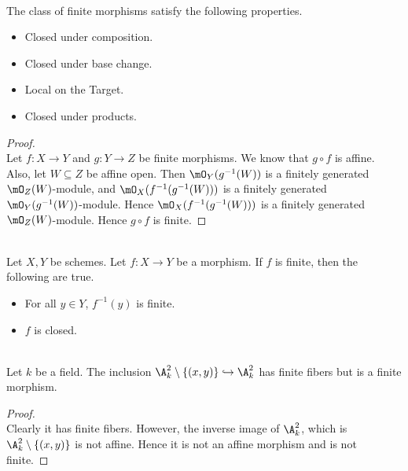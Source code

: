 \documentclass[a4paper]{article}
\begin{document}
\begin{lmm}{}{}\\
The class of finite morphisms satisfy the following properties. 
\begin{itemize}
\item Closed under composition. 
\item Closed under base change. 
\item Local on the Target. 
\item Closed under products. 
\end{itemize}
\begin{proof}\\
Let $f:X\to Y$ and $g:Y\to Z$ be finite morphisms. We know that $g\circ f$ is affine. Also, let $W\subseteq Z$ be affine open. Then $\mO_Y(g^{-1}(W))$ is a finitely generated $\mO_Z(W)$-module, and $\mO_X(f^{-1}(g^{-1}(W)))$ is a finitely generated $\mO_Y(g^{-1}(W))$-module. Hence $\mO_X(f^{-1}(g^{-1}(W)))$ is a finitely generated $\mO_Z(W)$-module. Hence $g\circ f$ is finite. 
\end{proof}
\end{lmm}

\begin{prp}{}{}\\
Let $X,Y$ be schemes. Let $f:X\to Y$ be a morphism. If $f$ is finite, then the following are true. 
\begin{itemize}
\item For all $y\in Y$, $f^{-1}(y)$ is finite. 
\item $f$ is closed. 
\end{itemize}
\end{prp}

\begin{eg}{}{}\\
Let $k$ be a field. The inclusion $\A_k^2\setminus\{(x,y)\}\hookrightarrow\A_k^2$ has finite fibers but is a finite morphism. 
\begin{proof}\\
Clearly it has finite fibers. However, the inverse image of $\A_k^2$, which is $\A_k^2\setminus\{(x,y)\}$ is not affine. Hence it is not an affine morphism and is not finite. 
\end{proof}
\end{eg}
\end{document}
